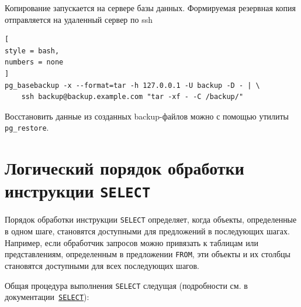 \documentclass[%
	11pt,
	a4paper,
	utf8,
		]{article}
\begin{document}
Копирование запускается на сервере базы данных. Формируемая резервная копия отправляется на удаленный сервер по ssh
\begin{lstlisting}[
style = bash,
numbers = none
]
pg_basebackup -x --format=tar -h 127.0.0.1 -U backup -D - | \
    ssh backup@backup.example.com "tar -xf - -C /backup/"
\end{lstlisting}

Восстановить данные из созданных backup-файлов можно с помощью утилиты \texttt{pg\_restore}.




\section{Логический порядок обработки инструкции \texttt{SELECT}}

Порядок обработки инструкции \texttt{SELECT} определяет, когда объекты, определенные в одном шаге, становятся доступными для предложений в последующих шагах. Например, если обработчик запросов можно привязать к таблицам или представлениям, определенным в предложении \texttt{FROM}, эти объекты и их столбцы становятся доступными для всех последующих шагов.

Общая процедура выполнения \texttt{SELECT} следущая (подробности см. в документации~\href{https://postgrespro.ru/docs/postgresql/9.5/sql-select}{\texttt{SELECT}}):
\end{document}
